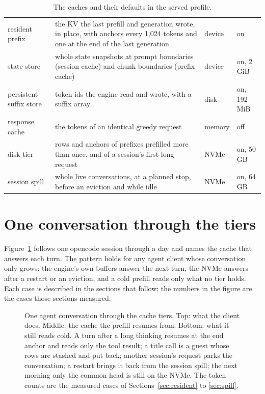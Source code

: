 \begin{table}[htbp]
\centering\small
\caption{The caches and their defaults in the served profile.}\label{tab:caches}
\begin{tabularx}{\linewidth}{@{}L{.2\linewidth}YL{.14\linewidth}L{.2\linewidth}@{}}
\toprule
{} &  &  &  \\
\midrule
resident prefix & the KV the last prefill and generation wrote, in place, with anchors every 1,024 tokens and one at the end of the last generation & device & on \\
state store & whole state snapshots at prompt boundaries (session cache) and chunk boundaries (prefix cache) & device & on, 2 GiB \\
persistent suffix store & token ids the engine read and wrote, with a suffix array & disk & on, 192 MiB \\
response cache & the tokens of an identical greedy request & memory & off \\
disk tier & rows and anchors of prefixes prefilled more than once, and of a session's first long request & NVMe & on, 50 GB \\
session spill & whole live conversations, at a planned stop, before an eviction and while idle & NVMe & on, 64 GB \\
\bottomrule
\end{tabularx}
\end{table}

\section{One conversation through the tiers}

Figure~\ref{fig:session-caches} follows one opencode session through a day and names the cache that answers each turn. The pattern holds for any agent client whose conversation only grows: the engine's own buffers answer the next turn, the NVMe answers after a restart or an eviction, and a cold prefill reads only what no tier holds. Each case is described in the sections that follow; the numbers in the figure are the cases those sections measured.

\begin{figure}[htbp]
\centering

\caption[One conversation through the cache tiers]{One agent conversation through the cache tiers. Top: what the client does. Middle: the cache the prefill resumes from. Bottom: what it still reads cold. A turn after a long thinking resumes at the end anchor and reads only the tool result; a title call is a guest whose rows are stashed and put back; another session's request parks the conversation; a restart brings it back from the session spill; the next morning only the common head is still on the NVMe. The token counts are the measured cases of Sections~\ref{sec:resident} to \ref{sec:spill}.}\label{fig:session-caches}
\end{figure}

